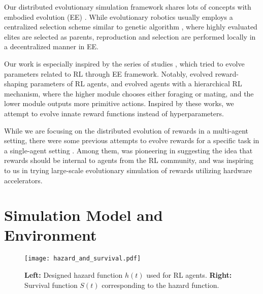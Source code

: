 Our distributed evolutionary simulation framework shares lots of concepts with embodied evolution (EE) \citep{watsonEmbodiedEvolutionDistributing2002,bredecheEmbodiedEvolutionCollective2018}. While evolutionary robotics \citep{nolfiEvolutionaryRoboticsBiology2004} usually employs a centralized selection scheme similar to genetic algorithm \citep{mitchellIntroductionGeneticAlgorithms1998}, where highly evaluated elites are selected as parents,
reproduction and selection are performed locally in a decentralized manner in EE.

Our work is especially inspired by the series of studies \citep{elfwingBiologicallyInspiredEmbodied2005,elfwingDarwinianEmbodiedEvolution2011,elfwingEmergencePolymorphicMating2014}, which tried to evolve parameters related to RL through EE framework. Notably, \citet{elfwingDarwinianEmbodiedEvolution2011} evolved reward-shaping parameters of RL agents, and \citet{elfwingEmergencePolymorphicMating2014} evolved agents with a hierarchical RL mechanism, where the higher module chooses either foraging or mating, and the lower module outputs more primitive actions. Inspired by these works, we attempt to evolve innate reward functions instead of hyperparameters.

While we are focusing on the distributed evolution of rewards in a multi-agent setting, there were some previous attempts to evolve rewards for a specific task in a single-agent setting \citep{singhWhereRewardsCome2009,niekumEvolutionRewardFunctions2011,zhengWhatCanLearned2020}. Among them, \citet{singhWhereRewardsCome2009} was pioneering in suggesting the idea that rewards should be internal to agents from the RL community, and \citet{zhengWhatCanLearned2020} was inspiring to us in trying large-scale evolutionary simulation of rewards utilizing hardware accelerators.

\section{Simulation Model and Environment}\label{sec:method}

\begin{figure}[t]
  \centering{}
  \texttt{[image: hazard\_and\_survival.pdf]}
  \caption{
    \textbf{Left:} Designed hazard function $h(t)$ used for RL agents.
    \textbf{Right:} Survival function $S(t)$ corresponding to the hazard function.
  }\label{figure:hs}
\end{figure}

